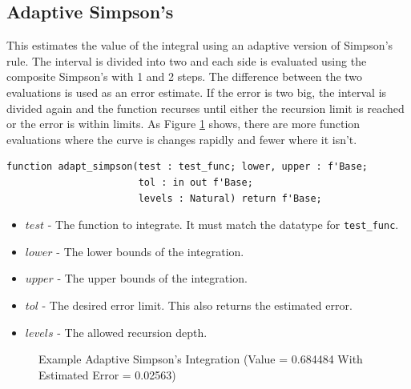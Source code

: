 \documentclass[10pt, openany]{book}
\newcommand{\indexfunc}[1]{\index[func]{#1}}
\newcommand{\datatype}[1]{\texttt{#1}}
\begin{document}
\subsection{Adaptive Simpson's}
This estimates the value of the integral using an adaptive version of Simpson's rule.  The interval is divided into two and each side is evaluated using the composite Simpson's with 1 and 2 steps.  The difference between the two evaluations is used as an error estimate.  If the error is two big, the interval is divided again and the function recurses until either the recursion limit is reached or the error is within limits.  As Figure \ref{tex:AdaptSimp} shows, there are more function evaluations where the curve is changes rapidly and fewer where it isn't.
\begin{lstlisting}
function adapt_simpson(test : test_func; lower, upper : f'Base;
                       tol : in out f'Base;
                       levels : Natural) return f'Base;
\end{lstlisting}
\indexfunc{integ-adapt\_simpson}
\begin{itemize}
  \item $test$ - The function to integrate.  It must match the datatype for \datatype{test\_func}.
  \item $lower$ - The lower bounds of the integration.
  \item $upper$ - The upper bounds of the integration.
  \item $tol$ - The desired error limit.  This also returns the estimated error.
  \item $levels$ - The allowed recursion depth.
\end{itemize}

\begin{figure}
  
  \caption{Example Adaptive Simpson's Integration (Value = 0.684484 With Estimated Error = 0.02563)}
  \label{tex:AdaptSimp}
\end{figure}
\end{document}

